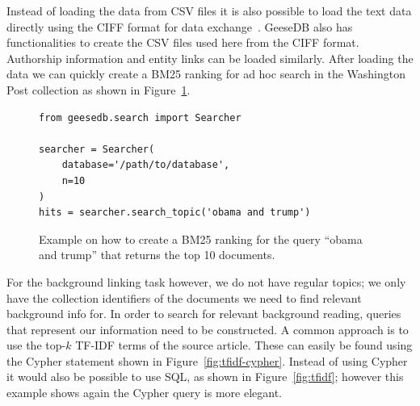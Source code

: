 Instead of loading the data from CSV files it is also possible to load the text data directly using the CIFF format for data exchange~\cite{ciff}. GeeseDB also has functionalities to create the CSV files used here from the CIFF format. Authorship information and entity links can be loaded similarly. After loading the data we can quickly create a BM25 ranking for ad hoc search in the Washington Post collection as shown in Figure~\ref{fig:code_bm25_ranking}.

\begin{figure}
	\begin{verbatim}
from geesedb.search import Searcher

searcher = Searcher(
	database='/path/to/database', 
	n=10
)
hits = searcher.search_topic('obama and trump')
	\end{verbatim}
	\caption{Example on how to create a BM25 ranking for the query ``obama and trump'' that returns the top 10 documents.}
	\label{fig:code_bm25_ranking}
\end{figure}

For the background linking task however, we do not have regular topics; we only have the collection identifiers of the documents we need to find relevant background info for. In order to search for relevant background reading, queries that represent our information need to be constructed. A common approach is to use the top-$k$ TF-IDF terms of the source article. These can easily be found using the Cypher statement shown in Figure~\ref{fig:tfidf-cypher}. Instead of using Cypher it would also be possible to use SQL, as shown in Figure~\ref{fig:tfidf}; however this example shows again the Cypher query is more elegant. 

